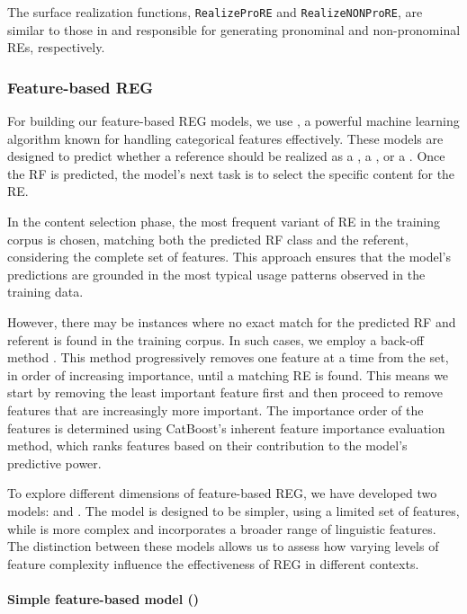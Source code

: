 The surface realization functions, \texttt{RealizeProRE} and \texttt{RealizeNONProRE}, are similar to those in  and responsible for generating pronominal and non-pronominal REs, respectively.



\subsubsection{Feature-based REG}

For building our feature-based REG models, we use  \citep{Prokhorenkova2018}, a powerful machine learning algorithm known for handling categorical features effectively. These models are designed to predict whether a reference should be realized as a , a , or a . Once the RF is predicted, the model's next task is to select the specific content for the RE.

In the content selection phase, the most frequent variant of RE in the training corpus is chosen, matching both the predicted RF class and the referent, considering the complete set of features. This approach ensures that the model's predictions are grounded in the most typical usage patterns observed in the training data.

However, there may be instances where no exact match for the predicted RF and referent is found in the training corpus. In such cases, we employ a back-off method \citep{ferreira2018neuralreg}. This method progressively removes one feature at a time from the set, in order of increasing importance, until a matching RE is found. This means we start by removing the least important feature first and then proceed to remove features that are increasingly more important. The importance order of the features is determined using CatBoost's inherent feature importance evaluation method, which ranks features based on their contribution to the model's predictive power.

To explore different dimensions of feature-based REG, we have developed two models:  and . The  model is designed to be simpler, using a limited set of features, while  is more complex and incorporates a broader range of linguistic features. The distinction between these models allows us to assess how varying levels of feature complexity influence the effectiveness of REG in different contexts.

\paragraph*{Simple feature-based model ()}

